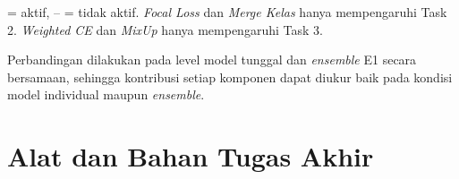 \begin{table}[h]
    \centering
    \caption{Konfigurasi komponen setiap variant \textit{ablation study}}
    \label{table:ablation_config}
    \begin{flushleft}
        \footnotesize{\checkmark = aktif, -- = tidak aktif.
        \textit{Focal Loss} dan \textit{Merge Kelas} hanya mempengaruhi
        Task 2. \textit{Weighted CE} dan \textit{MixUp} hanya
        mempengaruhi Task 3.}
    \end{flushleft}
\end{table}

Perbandingan dilakukan pada level model tunggal dan \textit{ensemble} E1
secara bersamaan, sehingga kontribusi setiap komponen dapat diukur baik
pada kondisi model individual maupun \textit{ensemble}. \par


\section{Alat dan Bahan Tugas Akhir} \label{III.Alat dan Bahan}

